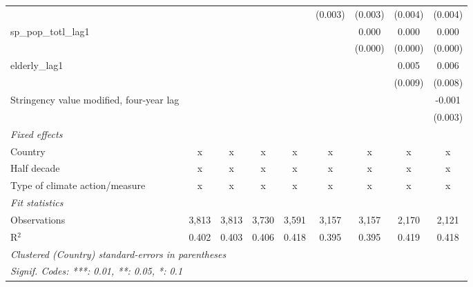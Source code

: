 \begin{tabular}{lcccccccc}
                                                     &               &               &               &               & (0.003)       & (0.003)       & (0.004)      & (0.004)\\   
   sp\_pop\_totl\_lag1                               &               &               &               &               &               & 0.000         & 0.000        & 0.000\\   
                                                     &               &               &               &               &               & (0.000)       & (0.000)      & (0.000)\\   
   elderly\_lag1                                     &               &               &               &               &               &               & 0.005        & 0.006\\   
                                                     &               &               &               &               &               &               & (0.009)      & (0.008)\\   
   Stringency value modified, four-year lag          &               &               &               &               &               &               &              & -0.001\\   
                                                     &               &               &               &               &               &               &              & (0.003)\\   
   \emph{Fixed effects}\\
   Country                                           & x             & x             & x             & x             & x             & x             & x            & x\\  
   Half decade                                       & x             & x             & x             & x             & x             & x             & x            & x\\  
   Type of climate action/measure                    & x             & x             & x             & x             & x             & x             & x            & x\\  
   \midrule \emph{Fit statistics}\\
   Observations                                      & 3,813         & 3,813         & 3,730         & 3,591         & 3,157         & 3,157         & 2,170        & 2,121\\  
   R$^2$                                             & 0.402         & 0.403         & 0.406         & 0.418         & 0.395         & 0.395         & 0.419        & 0.418\\  
   \midrule
   \multicolumn{9}{l}{\emph{Clustered (Country) standard-errors in parentheses}}\\
   \multicolumn{9}{l}{\emph{Signif. Codes: ***: 0.01, **: 0.05, *: 0.1}}\\
\end{tabular}
\par\endgroup



